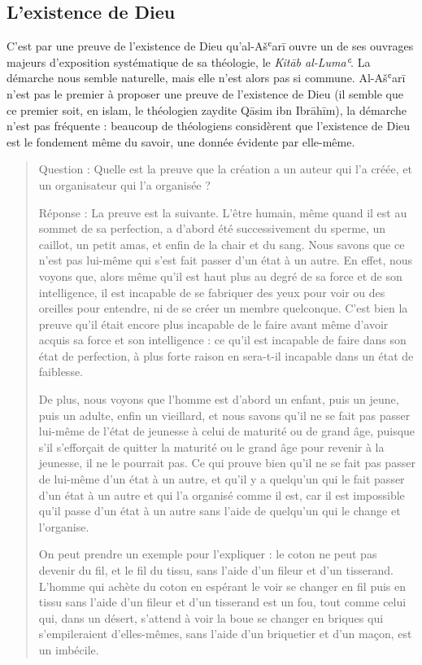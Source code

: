 
  
  \subsection{L'existence de Dieu}
  
 

C'est par une preuve de l'existence de Dieu qu'al-Ašʿarī ouvre un de ses
ouvrages majeurs d'exposition systématique de sa théologie, le
\emph{Kitāb al-Lumaʿ}. La démarche nous
semble naturelle, mais elle n'est alors pas si commune. Al-Ašʿarī n'est
pas le premier à proposer une preuve de l'existence de Dieu (il semble
que ce premier soit, en islam, le théologien zaydite Qāsim ibn Ibrāhīm),
la démarche n'est pas fréquente : beaucoup de théologiens considèrent
que l'existence de Dieu est le fondement même du savoir, une donnée
évidente par elle-même.




\begin{quote}
   Question : Quelle est la preuve que la création a un auteur qui l'a
créée, et un organisateur qui l'a organisée ?

Réponse : La preuve est la suivante. L'être humain, même quand il est au
sommet de sa perfection, a d'abord été successivement du sperme, un
caillot, un petit amas, et enfin de la chair et du sang. Nous savons que
ce n'est pas lui-même qui s'est fait passer d'un état à un autre. En
effet, nous voyons que, alors même qu'il est haut plus au degré de sa
force et de son intelligence, il est incapable de se fabriquer des yeux
pour voir ou des oreilles pour entendre, ni de se créer un membre
quelconque. C'est bien la preuve qu'il était encore plus incapable de le
faire avant même d'avoir acquis sa force et son intelligence : ce qu'il
est incapable de faire dans son état de perfection, à plus forte raison
en sera-t-il incapable dans un état de faiblesse.

De plus, nous voyons que l'homme est d'abord un enfant, puis un jeune,
puis un adulte, enfin un vieillard, et nous savons qu'il ne se fait pas
passer lui-même de l'état de jeunesse à celui de maturité ou de grand
âge, puisque s'il s'efforçait de quitter la maturité ou le grand âge
pour revenir à la jeunesse, il ne le pourrait pas. Ce qui prouve bien
qu'il ne se fait pas passer de lui-même d'un état à un autre, et qu'il y
a quelqu'un qui le fait passer d'un état à un autre et qui l'a organisé
comme il est, car il est impossible qu'il passe d'un état à un autre
sans l'aide de quelqu'un qui le change et l'organise.

On peut prendre un exemple pour l'expliquer : le coton ne peut pas
devenir du fil, et le fil du tissu, sans l'aide d'un fileur et d'un
tisserand. L'homme qui achète du coton en espérant le voir se changer en
fil puis en tissu sans l'aide d'un fileur et d'un tisserand est un fou,
tout comme celui qui, dans un désert, s'attend à voir la boue se changer
en briques qui s'empileraient d'elles-mêmes, sans l'aide d'un briquetier
et d'un maçon, est un imbécile. 
\end{quote}


